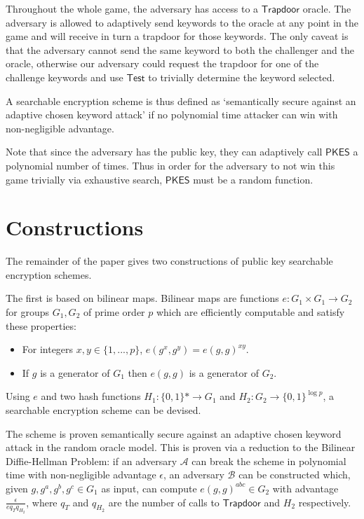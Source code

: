 \documentclass[a4paper,11pt]{article}
\begin{document}
    Throughout the whole game, the adversary has access to a $\mathsf{Trapdoor}$ oracle. The adversary is allowed to adaptively send keywords to the oracle at any point in the game and will receive in turn a trapdoor for those keywords. The only caveat is that the adversary cannot send the same keyword to both the challenger and the oracle, otherwise our adversary could request the trapdoor for one of the challenge keywords and use $\mathsf{Test}$ to trivially determine the keyword selected.

    A searchable encryption scheme is thus defined as `semantically secure against an adaptive chosen keyword attack' if no polynomial time attacker can win with non-negligible advantage.

    Note that since the adversary has the public key, they can adaptively call $\mathsf{PKES}$ a polynomial number of times. Thus in order for the adversary to not win this game trivially via exhaustive search, $\mathsf{PKES}$ must be a random function.

    \section{Constructions}

    The remainder of the paper gives two constructions of public key searchable encryption schemes.

    The first is based on bilinear maps. Bilinear maps are functions $e:G_1 \times G_1 \to G_2$ for groups $G_1, G_2$ of prime order $p$ which are efficiently computable and satisfy these properties:

    \begin{itemize}
        \item For integers $x, y \in \{1,...,p\}$, $e(g^x, g^y) = e(g, g)^{xy}$.
        \item If $g$ is a generator of $G_1$ then $e(g, g)$ is a generator of $G_2$.
    \end{itemize}

    Using $e$ and two hash functions $H_1: \{0, 1\}* \to G_1$ and $H_2: G_2 \to \{0, 1\}^{\log p}$, a searchable encryption scheme can be devised.

    The scheme is proven semantically secure against an adaptive chosen keyword attack in the random oracle model. This is proven via a reduction to the Bilinear Diffie-Hellman Problem: if an adversary $\mathcal{A}$ can break the scheme in polynomial time with non-negligible advantage $\epsilon$, an adversary $\mathcal{B}$ can be constructed which, given $g, g^a, g^b, g^c \in G_1$ as input, can compute $e(g, g)^{abc} \in G_2$ with advantage $\frac{\epsilon}{eq_Tq_{H_2}}$, where $q_T$ and $q_{H_2}$ are the number of calls to $\mathsf{Trapdoor}$ and $H_2$ respectively.
\end{document}
